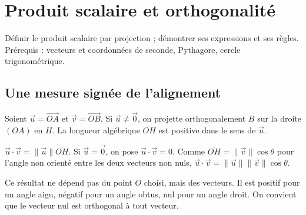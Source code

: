 \documentclass[../cours_1re.tex]{subfiles}
\begin{document}
\setcounter{chapter}{15}
\chapter{Produit scalaire et orthogonalité}
\label{ch:16}
\begin{objectif}
Définir le produit scalaire par projection ; démontrer ses expressions et ses règles.
Prérequis : vecteurs et coordonnées de seconde, Pythagore, cercle trigonométrique.
\end{objectif}
\section{Une mesure signée de l'alignement}
Soient $\vec u=\overrightarrow{OA}$ et $\vec v=\overrightarrow{OB}$.
Si $\vec u\ne\vec0$, on projette orthogonalement $B$ sur la droite $(OA)$ en $H$.
La longueur algébrique $\overline{OH}$ est positive dans le sens de $\vec u$.
\begin{definition}
$\vec u\cdot\vec v=\|\vec u\|\overline{OH}$.
Si $\vec u=\vec0$, on pose $\vec u\cdot\vec v=0$.
Comme $\overline{OH}=\|\vec v\|\cos\theta$ pour l'angle non orienté entre
les deux vecteurs non nuls, $\vec u\cdot\vec v=\|\vec u\|\|\vec v\|\cos\theta$.
\end{definition}
Ce résultat ne dépend pas du point $O$ choisi, mais des vecteurs.
Il est positif pour un angle aigu, négatif pour un angle obtus, nul pour
un angle droit. On convient que le vecteur nul est orthogonal à tout vecteur.

\begin{center}
\end{center}
\end{document}
